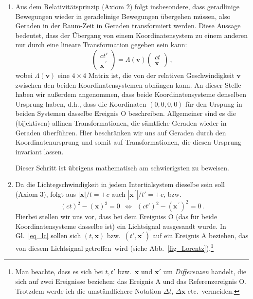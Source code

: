 \begin{enumerate}
\item
Aus dem Relativit\"atsprinzip (Axiom 2) 
folgt insbesondere, dass geradlinige
Bewegungen wieder in geradelinige 
Bewegungen \"ubergehen m\"ussen,
also Geraden in der Raum-Zeit in Geraden 
transformiert werden. Diese Aussage
bedeutet, dass der \"Ubergang von einem
Koordinaten\-sys\-tem zu einem anderen nur
durch eine lineare Transformation gegeben
sein kann:
\[   \left( \begin{array}{c} ct' \\ \pmb{x}^{\, \prime} 
         \end{array} \right) = \Lambda(\pmb{v}) 
         \left( \begin{array}{c} ct \\ \pmb{x} 
         \end{array} \right)  \, ,   \]
wobei $\Lambda(\pmb{v})$ eine $4\times4$
Matrix ist, die von der relativen Geschwindigkeit
$\pmb{v}$ zwischen den beiden Koordinatensystemen
abh\"angen kann. An dieser Stelle
haben wir au\ss erdem angenommen, dass
beide Koordinatensys\-teme denselben
Ursprung haben, d.h., dass die Koordinaten
$(0,0,0,0)$ f\"ur den Urspung in beiden Systemen dasselbe
Ereignis O beschreiben. Allgemeiner sind
es die (bijektiven) affinen Transformationen, die
s\"amtliche Geraden wieder in Geraden
\"uberf\"uhren. Hier beschr\"anken wir uns auf Geraden durch den
Koordinatenursprung und somit auf Transformationen, die
diesen Ursprung invariant lassen.

Dieser Schritt ist \"ubrigens mathematisch
am schwierigsten zu beweisen.
\item
Da die Lichtegschwindigkeit in jedem
Intertialsystem dieselbe sein soll (Axiom 3),
folgt aus $|\pmb{x}|/t=\pm c$ auch $|\pmb{x}^{\,\prime}|/t'=\pm c$, 
bzw.\
\begin{equation}
\label{eq_lc}
   (ct)^2 - (\pmb{x})^2 = 0 ~~ \Longleftrightarrow
   ~~ (ct')^2 - (\pmb{x}^{\,\prime})^2=0   \, .
\end{equation}  
Hierbei stellen wir uns vor, dass bei dem
Ereigniss O  (das f\"ur beide Koordinatensysteme
dasselbe ist) ein Lichtsignal ausgesandt wurde.
In Gl.\ \ref{eq_lc} sollen sich 
$(t,\pmb{x})$ bzw.\ $(t',\pmb{x}^{\,\prime})$ auf
ein Ereignis A beziehen, das von diesem
Lichtsignal \glqq getroffen\grqq\ 
wird (siehe Abb.\ \ref{fig_Lorentz}).\footnote{Man beachte, dass es sich bei
$t,t'$ bzw.\ $\pmb{x}$ und $\pmb{x}'$ um
{\em Differenzen} handelt, die sich auf 
zwei Ereignisse beziehen: das Ereignis
A und das
Referenzereignis O. Trotzdem werde ich
die umst\"andlichere Notation $\Delta t$,
$\Delta \pmb{x}$ etc.\ vermeiden.}


\end{enumerate}
